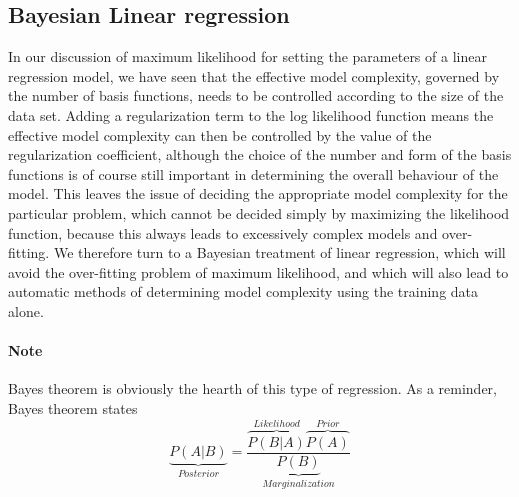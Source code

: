 \documentclass[../main.tex]{subfiles}
\begin{document}
\subsection{Bayesian Linear regression}
In our discussion of maximum likelihood for setting the parameters of a linear regression
model, we have seen that the effective model complexity, governed by the
number of basis functions, needs to be controlled according to the size of the data
set. Adding a regularization term to the log likelihood function means the effective
model complexity can then be controlled by the value of the regularization coefficient,
although the choice of the number and form of the basis functions is of course
still important in determining the overall behaviour of the model.
This leaves the issue of deciding the appropriate model complexity for the particular
problem, which cannot be decided simply by maximizing the likelihood function,
because this always leads to excessively complex models and over-fitting. We therefore turn to a Bayesian treatment of linear regression, which will
avoid the over-fitting problem of maximum likelihood, and which will also lead to
automatic methods of determining model complexity using the training data alone.

\paragraph{Note} Bayes theorem is obviously the hearth of this type of regression. As a reminder, Bayes theorem states
\begin{equation}
    \underbrace{P(A|B)}_{Posterior} = \frac{\overbrace{P(B|A)}^{Likelihood} \overbrace{P(A)}^{Prior}}{\underbrace{P(B)}_{Marginalization}}
\end{equation}
\end{document}
